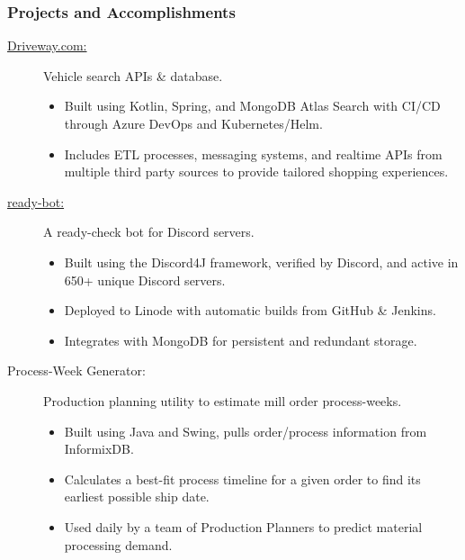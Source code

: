\documentclass{article}
\begin{document}
\subsubsection*{Projects and Accomplishments}
    \begin{description}

        \item[\href{https://driveway.com/shop}{Driveway.com:\hspace{0.075in}}] Vehicle search APIs \& database.
            \begin{itemize}
                \item Built using Kotlin, Spring, and MongoDB Atlas Search with CI/CD through Azure DevOps and Kubernetes/Helm.
                \item Includes ETL processes, messaging systems, and realtime APIs from multiple third party sources to provide tailored shopping experiences.
            \end{itemize}

            \vspace{0.5em}
        \item[\href{https://www.github.com/BurnsCommaLucas/ready-botlin}{ready-bot:\hspace{0.075in}}] A ready-check bot for Discord servers.
            \begin{itemize}
                \item Built using the Discord4J framework, verified by Discord, and active in 650+ unique Discord servers.
                \item Deployed to Linode with automatic builds from GitHub \& Jenkins.
                \item Integrates with MongoDB for persistent and redundant storage.
            \end{itemize}

            \vspace{0.5em}

        \item[Process-Week Generator:] Production planning utility to estimate mill order process-weeks.
            \begin{itemize}
                \item Built using Java and Swing, pulls order/process information from InformixDB.
                \item Calculates a best-fit process timeline for a given order to find its earliest possible ship date.
                \item Used daily by a team of Production Planners to predict material processing demand.
            \end{itemize}


\end{description}
\end{document}
